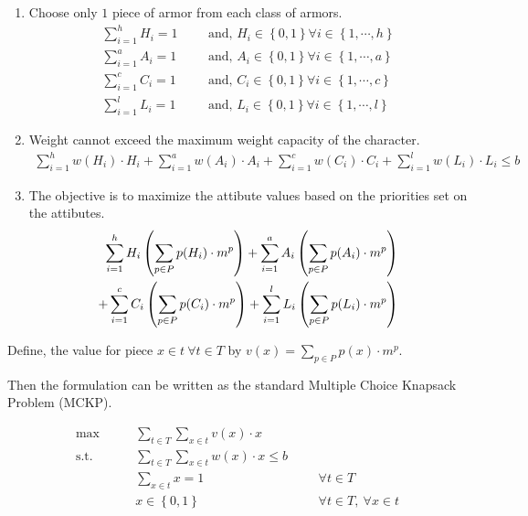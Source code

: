 \documentclass[10pt]{article}
\newcommand{\cbrace}[1]{\left\lbrace #1 \right\rbrace}
\begin{document}
    \begin{enumerate}
        \item Choose only $1$ piece of armor from each class of armors.
            \begin{align}
                \sum\limits_{i=1}^h H_i = 1 &&& \text{and, } H_i \in \cbrace{0, 1} \forall i \in \cbrace{1, \cdots, h}\\
                \sum\limits_{i=1}^a A_i = 1 &&& \text{and, } A_i \in \cbrace{0, 1} \forall i \in \cbrace{1, \cdots, a}\\
                \sum\limits_{i=1}^c C_i = 1 &&& \text{and, } C_i \in \cbrace{0, 1} \forall i \in \cbrace{1, \cdots, c}\\
                \sum\limits_{i=1}^l L_i = 1 &&& \text{and, } L_i \in \cbrace{0, 1} \forall i \in \cbrace{1, \cdots, l}
            \end{align}
        \item Weight cannot exceed the maximum weight capacity of the character.
            \begin{align}
                \sum\limits_{i=1}^h w(H_i) \cdot H_i + \sum\limits_{i=1}^a w(A_i) \cdot A_i  
                + \sum\limits_{i=1}^c w(C_i) \cdot C_i  + \sum\limits_{i=1}^l w(L_i) \cdot L_i \leq b
            \end{align}
        \item The objective is to maximize the attibute values based on the priorities set on the attibutes.
            \begin{align}
                \sum\limits_{i=1}^h H_i \left( \sum\limits_{p \in P} p(H_i) \cdot m^p \right) 
                + \sum\limits_{i=1}^a A_i \left( \sum\limits_{p \in P} p(A_i) \cdot m^p \right)  \notag \\
                + \sum\limits_{i=1}^c C_i \left( \sum\limits_{p \in P} p(C_i) \cdot m^p \right)
                + \sum\limits_{i=1}^l L_i \left( \sum\limits_{p \in P} p(L_i) \cdot m^p \right)
            \end{align}
    \end{enumerate}

    Define, the value for piece $x \in t ~\forall t \in T$ by $v(x) = \sum\limits_{p \in P} p(x) \cdot m^p$.

    Then the formulation can be written as the standard Multiple Choice Knapsack Problem (MCKP).

    \begin{align}
        \max \qquad & \sum\limits_{t \in T} \sum\limits_{x \in t} v(x) \cdot x \\
        \text{s.t.} \qquad & \sum\limits_{t \in T} \sum\limits_{x \in t} w(x) \cdot x \leq b &&& \label{kpe1}\\
                            & \sum\limits_{x \in t} x = 1 &&& \forall t \in T \\
                            &  x \in \cbrace{0, 1} &&& \forall t \in T, ~\forall x \in t \label{kpe2}
    \end{align}
\end{document}
